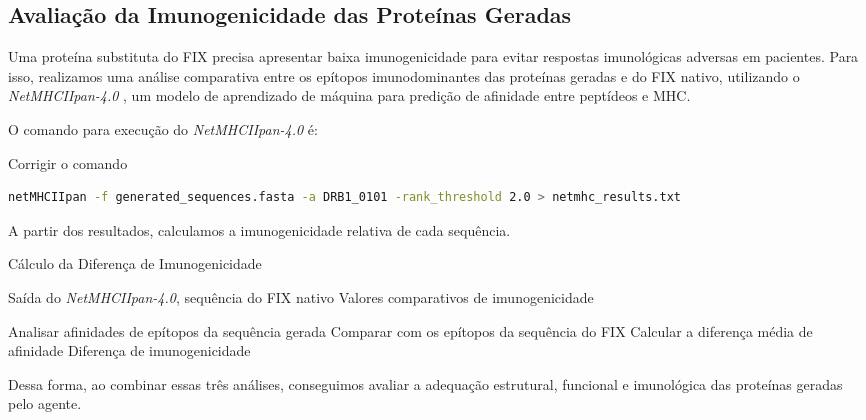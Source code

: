 \subsection{Avaliação da Imunogenicidade das Proteínas Geradas}

Uma proteína substituta do FIX precisa apresentar baixa imunogenicidade para evitar respostas imunológicas adversas em pacientes. 
Para isso, realizamos uma análise comparativa entre os epítopos imunodominantes das proteínas geradas e do FIX nativo, 
utilizando o \textit{NetMHCIIpan-4.0} \cite{Jensen2018NetMHCIIpan},
um modelo de aprendizado de máquina para predição de afinidade entre peptídeos e MHC.

O comando para execução do \textit{NetMHCIIpan-4.0} é:

{\color{red} Corrigir o comando}
\begin{lstlisting}[language=bash, breaklines=true, frame=single, backgroundcolor=\color{lightgray}]
  netMHCIIpan -f generated_sequences.fasta -a DRB1_0101 -rank_threshold 2.0 > netmhc_results.txt
\end{lstlisting}

A partir dos resultados, calculamos a imunogenicidade relativa de cada sequência.

\begin{algorithm}
  \caption{Cálculo da Diferença de Imunogenicidade}
  \label{alg:immune_evaluation}
  \begin{algorithmic}[1]
  \Require Saída do \textit{NetMHCIIpan-4.0}, sequência do FIX nativo
  \Ensure Valores comparativos de imunogenicidade

  \State Analisar afinidades de epítopos da sequência gerada
  \State Comparar com os epítopos da sequência do FIX
  \State Calcular a diferença média de afinidade
  \State \Return Diferença de imunogenicidade
  \end{algorithmic}
\end{algorithm}

Dessa forma, ao combinar essas três análises, conseguimos avaliar a adequação estrutural, 
funcional e imunológica das proteínas geradas pelo agente.





